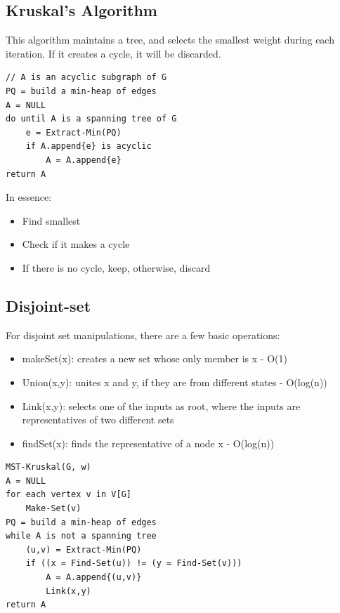 \documentclass[nobib]{tufte-handout}
\begin{document}
\subsection{Kruskal's Algorithm}
This algorithm maintains a tree, and selects the smallest weight during each iteration. If it creates a cycle, it will be discarded.\\
\begin{lstlisting}
// A is an acyclic subgraph of G
PQ = build a min-heap of edges
A = NULL
do until A is a spanning tree of G
    e = Extract-Min(PQ)
    if A.append{e} is acyclic
        A = A.append{e}
return A
\end{lstlisting}
In essence:
\begin{itemize}
    \item Find smallest
    \item Check if it makes a cycle
    \item If there is no cycle, keep, otherwise, discard
\end{itemize}
\subsection{Disjoint-set}
For disjoint set manipulations, there are a few basic operations:
\begin{itemize}
    \item makeSet(x): creates a new set whose only member is x - O(1)
    \item Union(x,y): unites x and y, if they are from different states - O(log(n))
    \item Link(x,y): selects one of the inputs as root, where the inputs are representatives of two different sets
    \item findSet(x): finds the representative of a node x - O(log(n))
\end{itemize}
\begin{lstlisting}
MST-Kruskal(G, w)
A = NULL
for each vertex v in V[G]
    Make-Set(v)
PQ = build a min-heap of edges
while A is not a spanning tree
    (u,v) = Extract-Min(PQ)
    if ((x = Find-Set(u)) != (y = Find-Set(v)))
        A = A.append{(u,v)}
        Link(x,y)
return A
\end{lstlisting}
\end{document}
